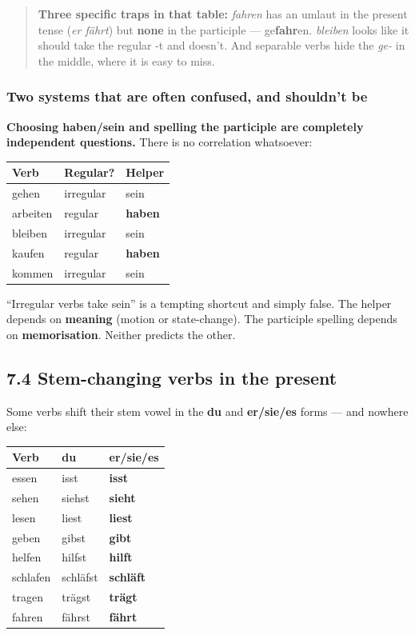 \documentclass[
  11pt,
]{article}
\newcounter{none} %
\begin{document}
\begin{quote}
\textbf{Three specific traps in that table:} \emph{fahren} has an umlaut
in the present tense (\emph{er fährt}) but \textbf{none} in the
participle --- ge\textbf{fahr}en. \emph{bleiben} looks like it should
take the regular -t and doesn't. And separable verbs hide the \emph{ge-}
in the middle, where it is easy to miss.
\end{quote}

\subsubsection{Two systems that are often confused, and shouldn't
be}\label{two-systems-that-are-often-confused-and-shouldnt-be}

\textbf{Choosing haben/sein and spelling the participle are completely
independent questions.} There is no correlation whatsoever:

{\def\LTcaptype{none} %
\begin{longtable}[]{@{}lll@{}}
\toprule\noalign{}
Verb & Regular? & Helper \\
\midrule\noalign{}
\endhead
\bottomrule\noalign{}
\endlastfoot
gehen & irregular & sein \\
arbeiten & regular & \textbf{haben} \\
bleiben & irregular & sein \\
kaufen & regular & \textbf{haben} \\
kommen & irregular & sein \\
\end{longtable}
}

``Irregular verbs take sein'' is a tempting shortcut and simply false.
The helper depends on \textbf{meaning} (motion or state-change). The
participle spelling depends on \textbf{memorisation}. Neither predicts
the other.

\subsection{7.4 Stem-changing verbs in the
present}\label{stem-changing-verbs-in-the-present}

Some verbs shift their stem vowel in the \textbf{du} and
\textbf{er/sie/es} forms --- and nowhere else:

{\def\LTcaptype{none} %
\begin{longtable}[]{@{}lll@{}}
\toprule\noalign{}
Verb & du & er/sie/es \\
\midrule\noalign{}
\endhead
\bottomrule\noalign{}
\endlastfoot
essen & isst & \textbf{isst} \\
sehen & siehst & \textbf{sieht} \\
lesen & liest & \textbf{liest} \\
geben & gibst & \textbf{gibt} \\
helfen & hilfst & \textbf{hilft} \\
schlafen & schläfst & \textbf{schläft} \\
tragen & trägst & \textbf{trägt} \\
fahren & fährst & \textbf{fährt} \\
\end{longtable}
}
\end{document}
